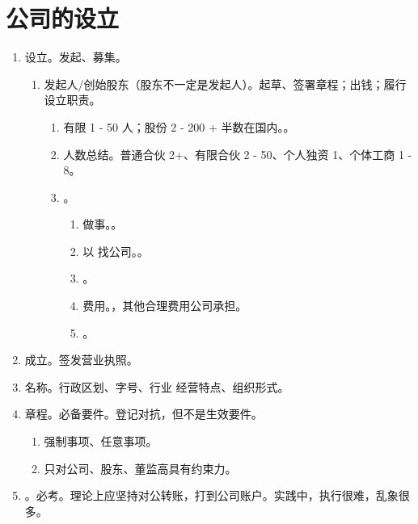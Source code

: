 \section{公司的设立}
\begin{enumerate}
  \item 设立。发起、募集。
        \begin{enumerate}
          \item 发起人/创始股东（股东不一定是发起人）。起草、签署章程；出钱；履行设立职责。
                \begin{enumerate}
                  \item 有限 1 - 50 人；股份 2 - 200 + 半数在国内。。
                  \item 人数总结。普通合伙 2+、有限合伙 2 - 50、个人独资 1、个体工商 1 - 8。
                  \item {}。
                        \begin{enumerate}
                          \item {}做事。。
                          \item 以 \yjt 找公司。。
                          \item {}。
                          \item 费用。，其他合理费用公司承担。
                          \item \sjt {}。
                        \end{enumerate}
                \end{enumerate}
        \end{enumerate}
  \item 成立。签发营业执照。
  \item 名称。行政区划、字号、行业 \hz 经营特点、组织形式。
  \item 章程。必备要件。登记对抗，但不是生效要件。
        \begin{enumerate}
          \item 强制事项、任意事项。
          \item 只对公司、股东、董监高具有约束力。
        \end{enumerate}
  \item {}。必考。理论上应坚持对公转账，打到公司账户。实践中，执行很难，乱象很多。
        \begin{enumerate}

\end{enumerate}
\end{enumerate}
